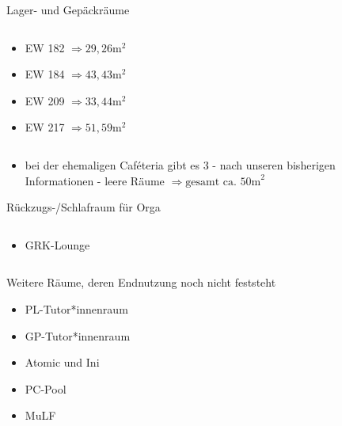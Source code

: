 \documentclass[compress,]{beamer}
\begin{document}
\begin{frame}{Lager- und Gepäckräume}
  \begin{columns}[onlytextwidth]
    \begin{column}{0.3\textwidth}
      \begin{itemize}
        \item<1-> EW 182 $\Rightarrow 29,26 \mbox{m}^{2}$
        \item<2-> EW 184 $\Rightarrow 43,43 \mbox{m}^{2}$
        \item<3-> EW 209 $\Rightarrow 33,44 \mbox{m}^{2}$
        \item<4-> EW 217 $\Rightarrow 51,59 \mbox{m}^{2}$
      \end{itemize}
    \end{column}
    \begin{column}{0.7\textwidth}
    \end{column}
  \end{columns}
  \begin{itemize}
    \item<6-> bei der ehemaligen Caféteria gibt es 3 - nach unseren bisherigen Informationen - leere Räume $\Rightarrow\mbox{gesamt ca. 50m}^{2}$
  \end{itemize}
\end{frame}

\begin{frame}{Rückzugs-/Schlafraum für Orga}
  \begin{columns}[onlytextwidth]
    \begin{column}{0.5\textwidth}
      \begin{itemize}
        \item<1-> GRK-Lounge
      \end{itemize}
    \end{column}
    \begin{column}{0.5\textwidth}
    \end{column}
  \end{columns}
\end{frame}

\begin{frame}{Weitere Räume, deren Endnutzung noch nicht feststeht}
  \begin{itemize}
    \item PL-Tutor*innenraum
    \item GP-Tutor*innenraum
    \item Atomic und Ini
    \item PC-Pool
    \item MuLF
  \end{itemize}
\end{frame}
\end{document}
